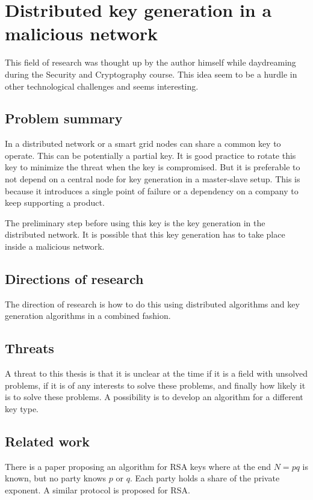 \section{Distributed key generation in a malicious network}
This field of research was thought up by the author himself while daydreaming during the Security and Cryptography course.
This idea seem to be a hurdle in other technological challenges and seems interesting.

\subsection*{Problem summary}
In a distributed network or a smart grid nodes can share a common key to operate.
This can be potentially a partial key.
It is good practice to rotate this key to minimize the threat when the key is compromised.
But it is preferable to not depend on a central node for key generation in a master-slave setup.
This is because it introduces a single point of failure or a dependency on a company to keep supporting a product.

The preliminary step before using this key is the key generation in the distributed network.
It is possible that this key generation has to take place inside a malicious network.
\subsection*{Directions of research}
The direction of research is how to do this using distributed algorithms and key generation algorithms in a combined fashion.

\subsection*{Threats}
A threat to this thesis is that it is unclear at the time if it is a field with unsolved problems,
if it is of any interests to solve these problems, and finally how likely it is to solve these problems.
A possibility is to develop an algorithm for a different key type.

\subsection*{Related work}
There is a paper proposing an algorithm for RSA keys\cite{boneh1997efficient} where at the end $N=pq$ is known,
but no party knows $p$ or $q$. Each party holds a share of the private exponent.
A similar protocol is proposed for RSA\cite{gilboa1999two}.

